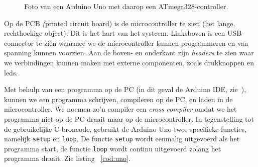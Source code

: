 \begin{figure}[!ht]
\centering
{}
\caption{Foto van een Arduino Uno met daarop een ATmega328-controller.}
\label{fig:arduinouno}
\end{figure}

Op de PCB \textsl(printed circuit board) is de microcontroller te zien (het lange, rechthoekige object). Dit is het hart van het systeem. Linksboven is een USB-connector te zien waarmee we de microcontroller kunnen programmeren en van spanning kunnen voorzien. Aan de boven- en onderkant zijn \textsl{headers} te zien waar we verbindingen kunnen maken met externe componenten, zoals drukknoppen en leds.

Met behulp van een programma op de PC (in dit geval de Arduino IDE, zie~\cite{arduino}), kunnen we een programma schrijven, compileren op de PC, en laden in de microcontroller. We noemen zo'n compiler een \textsl{cross compiler} omdat we het programma niet op de PC draait maar op de microcontroller. In tegenstelling tot de gebruikelijke C-broncode, gebruikt de Arduino Uno twee specifieke functies, namelijk \lstinline|setup| en \lstinline|loop|. De functie \lstinline|setup| wordt eenmalig uitgevoerd als het programma start, de functie \lstinline|loop| wordt continu uitgevoerd zolang het programma draait. Zie listing~ \ref{cod:uno}.

